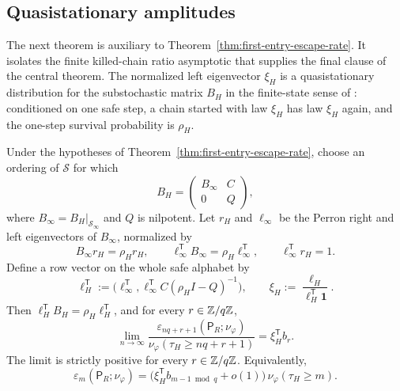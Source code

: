 \subsection{Quasistationary amplitudes}

The next theorem is auxiliary to
Theorem~\ref{thm:first-entry-escape-rate}.  It isolates the finite
killed-chain ratio asymptotic that supplies the final clause of the
central theorem.  The normalized left eigenvector \(\xi_H\) is a
quasistationary distribution for the substochastic matrix \(B_H\) in the
finite-state sense of \citet{DarrochSeneta1965}: conditioned on one safe
step, a chain started with law \(\xi_H\) has law \(\xi_H\) again, and the
one-step survival probability is \(\rho_H\).

\begin{theorem}
\label{thm:quasistationary-ambiguity}
Under the hypotheses of Theorem~\ref{thm:first-entry-escape-rate},
choose an ordering of \(\mathcal S\) for which
\[
  B_H=
  \begin{pmatrix}
    B_\infty & C\\
    0 & Q
  \end{pmatrix},
\]
where \(B_\infty=B_H|_{\mathcal S_\infty}\) and \(Q\) is nilpotent.  Let
\(r_H\) and \(\ell_\infty\) be the Perron right and left eigenvectors of
\(B_\infty\), normalized by
\[
  B_\infty r_H=\rho_H r_H,
  \qquad
  \ell_\infty^{\mathsf T}B_\infty=\rho_H\ell_\infty^{\mathsf T},
  \qquad
  \ell_\infty^{\mathsf T}r_H=1.
\]
Define a row vector on the whole safe alphabet by
\[
  \ell_H^{\mathsf T}
  :=
  \bigl(
    \ell_\infty^{\mathsf T},
    \ell_\infty^{\mathsf T}C(\rho_H I-Q)^{-1}
  \bigr),
  \qquad
  \xi_H:=\frac{\ell_H}{\ell_H^{\mathsf T}\mathbf 1}.
\]
Then \(\ell_H^{\mathsf T}B_H=\rho_H\ell_H^{\mathsf T}\), and for every
\(r\in\mathbb{Z}/q\mathbb{Z}\),
\[
  \lim_{n\to\infty}
  \frac{
    \varepsilon_{nq+r+1}(\mathsf P_R;\nu_\varphi)
  }{
    \nu_\varphi(\tau_H\ge nq+r+1)
  }
  = \xi_H^{\mathsf T}b_r.
\]
The limit is strictly positive for every \(r\in\mathbb{Z}/q\mathbb{Z}\).
Equivalently,
\[
  \varepsilon_m(\mathsf P_R;\nu_\varphi)
  = \bigl(\xi_H^{\mathsf T}b_{m-1\bmod q}+o(1)\bigr)\,
    \nu_\varphi(\tau_H\ge m).
\]
\end{theorem}

